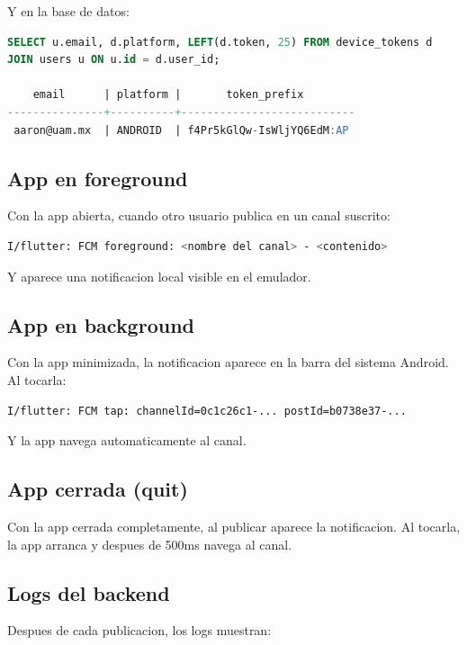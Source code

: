 Y en la base de datos:

\begin{lstlisting}[language=SQL]
SELECT u.email, d.platform, LEFT(d.token, 25) FROM device_tokens d
JOIN users u ON u.id = d.user_id;

    email      | platform |       token_prefix
---------------+----------+---------------------------
 aaron@uam.mx  | ANDROID  | f4Pr5kGlQw-IsWljYQ6EdM:AP
\end{lstlisting}

\subsection{App en foreground}

Con la app abierta, cuando otro usuario publica en un canal suscrito:

\begin{lstlisting}[language=bash]
I/flutter: FCM foreground: <nombre del canal> - <contenido>
\end{lstlisting}

Y aparece una notificacion local visible en el emulador.

\subsection{App en background}

Con la app minimizada, la notificacion aparece en la barra del sistema Android. Al tocarla:

\begin{lstlisting}[language=bash]
I/flutter: FCM tap: channelId=0c1c26c1-... postId=b0738e37-...
\end{lstlisting}

Y la app navega automaticamente al canal.

\subsection{App cerrada (quit)}

Con la app cerrada completamente, al publicar aparece la notificacion. Al tocarla, la app arranca y despues de 500ms navega al canal.

\subsection{Logs del backend}

Despues de cada publicacion, los logs muestran:


